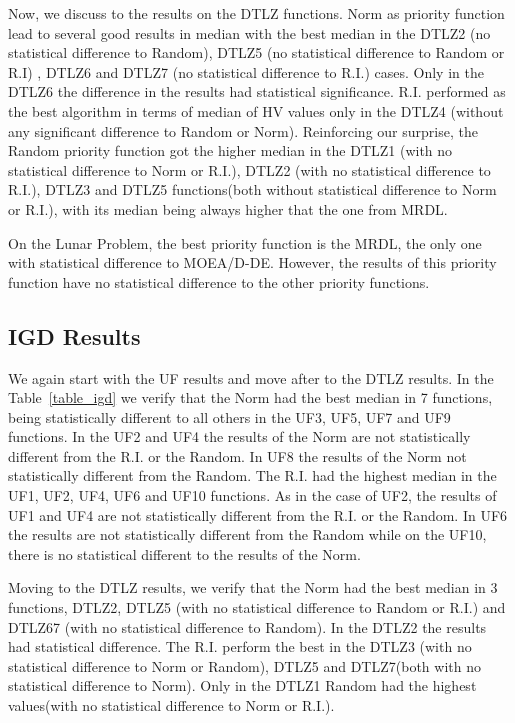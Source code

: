 Now, we discuss to the results on the DTLZ functions. Norm as priority function lead to several good results in median with the best median in the DTLZ2 (no statistical difference to Random), DTLZ5 (no statistical difference to Random or R.I) , DTLZ6 and DTLZ7 (no statistical difference to R.I.) cases. Only in the DTLZ6 the difference in the results had statistical significance. R.I. performed as the best algorithm in terms of median of HV values only in the DTLZ4 (without any significant difference to Random or Norm). Reinforcing our surprise, the Random priority function got the higher median in the DTLZ1 (with no statistical difference to Norm or R.I.), DTLZ2 (with no statistical difference to R.I.), DTLZ3 and DTLZ5 functions(both without statistical difference to Norm or R.I.), with its median being always higher that the one from MRDL. 

On the Lunar Problem, the best priority function is the MRDL, the only one with statistical difference to MOEA/D-DE. However, the results of this priority function have no statistical difference to the other priority functions.

\subsection{IGD Results}

We again start with the UF results and move after to the DTLZ results. In the Table~\ref{table_igd} we verify that the Norm had the best median in 7 functions, being statistically different to all others in the UF3, UF5, UF7 and UF9 functions. In the UF2 and UF4 the results of the Norm are not statistically different from the R.I. or the Random. In UF8 the results of the Norm not statistically different from the Random. The R.I. had the highest median in the UF1, UF2, UF4, UF6 and UF10 functions. As in the case of UF2, the results of UF1 and UF4 are not statistically different from the R.I. or the Random. In UF6 the results are not statistically different from the Random while on the UF10, there is no statistical different to the results of the Norm. 

Moving to the DTLZ results, we verify that the Norm had the best median in 3 functions, DTLZ2, DTLZ5 (with no statistical difference to Random or R.I.) and DTLZ67 (with no statistical difference to Random). In the DTLZ2 the results had statistical difference. The R.I. perform the best in the DTLZ3 (with no statistical difference to Norm or Random), DTLZ5 and DTLZ7(both with no statistical difference to Norm). Only in the DTLZ1  Random had the highest values(with no statistical difference to Norm or R.I.).


